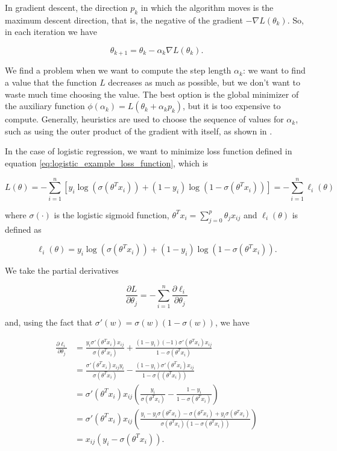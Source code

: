 In gradient descent, the direction $p_k$ in which the algorithm moves is the maximum descent direction, that is, the negative of the gradient $-\nabla L(\theta_k)$. So, in each iteration we have

\begin{equation}
  \theta_{k+1} = \theta_k - \alpha_k \nabla L(\theta_k).
\end{equation}

We find a problem when we want to compute the step length $\alpha_k$: we want to find a value that the function $L$ decreases as much as possible, but we don't want to waste much time choosing the value. The best option is the global minimizer of the auxiliary function $\phi(\alpha_k) = L(\theta_k + \alpha_k p_k)$, but it is too expensive to compute. Generally, heuristics are used to choose the sequence of values for $\alpha_k$, such as using the outer product of the gradient with itself, as shown in \cite{duchi2011adaptive}.

In the case of logistic regression, we want to minimize loss function defined in equation \ref{eq:logistic_example_loss_function}, which is

$$
  L(\theta) = - \sum_{i=1}^{n} \left[ y_i \log(\sigma(\theta^T x_i)) + (1-y_i) \log(1-\sigma(\theta^T x_i)) \right] =
  - \sum_{i=1}^{n}{\ell_i(\theta)}
$$

where $\sigma(\cdot)$ is the logistic sigmoid function, $\theta^T x_i = \sum_{j=0}^{p}{\theta_j x_{ij}}$ and $\ell_i(\theta)$ is defined as

$$
  \ell_i(\theta) = y_i \log(\sigma(\theta^T x_i)) + (1-y_i) \log(1-\sigma(\theta^T x_i)).
$$

We take the partial derivatives

$$
  \frac{\partial L}{\partial \theta_j} = - \sum_{i = 1}^n { \frac{\partial \ell_i}{\partial \theta_j} }
$$

and, using the fact that $\sigma'(w) = \sigma(w)(1-\sigma(w))$, we have

\begin{equation}
  \begin{split}
    \frac{\partial \ell_i}{\partial \theta_j} & =
    \frac{y_i \sigma'(\theta^T x_i) x_{ij} }  {\sigma(\theta^T x_i)} + \frac{(1 - y_i) (-1) \sigma'(\theta^T x_i) x_{ij}} {1 - \sigma(\theta^T x_i)} \\
    & = \frac{\sigma'(\theta^T x_i) x_{ij} y_i}{\sigma(\theta^T x_i)} - \frac{(1 - y_i) \sigma'(\theta^T x_i) x_{ij}}{1 - \sigma((\theta^T x_i))} \\
    & = \sigma'(\theta^T x_i) x_{ij} \left(\frac{y_i}{\sigma(\theta^T x_i)} - \frac{1-y_i}{1-\sigma(\theta^T x_i)} \right) \\
    & = \sigma'(\theta^T x_i) x_{ij} \left(\frac{y_i - y_i \sigma(\theta^T x_i) -
    \sigma(\theta^T x_i) + y_i \sigma(\theta^T x_i)}{\sigma(\theta^T x_i)(1-\sigma(\theta^T x_i))} \right) \\
    & = x_{ij}(y_i - \sigma(\theta^T x_i)).
  \end{split}
\end{equation}

